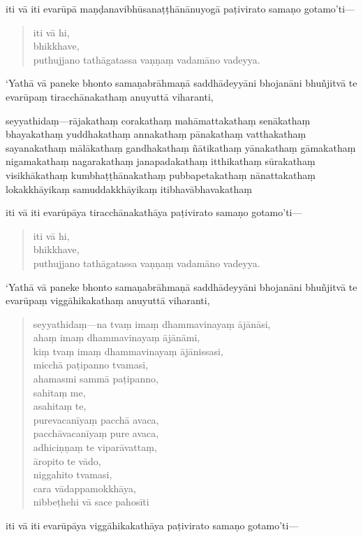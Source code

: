 \documentclass[11pt,twoside,openright]{book}
\begin{document}
\pstart
iti vā iti evarūpā maṇḍanavibhūsanaṭṭhānānuyogā paṭivirato samaṇo gotamo’ti—
\pend

\begin{verse}
iti vā hi,\\
\vin  bhikkhave,\\
\vin  puthujjano tathāgatassa vaṇṇaṃ vadamāno vadeyya.

\end{verse}
\pstart
‘Yathā vā paneke bhonto samaṇabrāhmaṇā saddhādeyyāni bhojanāni bhuñjitvā te evarūpaṃ tiracchānakathaṃ anuyuttā viharanti,
\pend

\pstart
seyyathidaṃ—rājakathaṃ corakathaṃ mahāmattakathaṃ senākathaṃ bhayakathaṃ yuddhakathaṃ annakathaṃ pānakathaṃ vatthakathaṃ sayanakathaṃ mālākathaṃ gandhakathaṃ ñātikathaṃ yānakathaṃ gāmakathaṃ nigamakathaṃ nagarakathaṃ janapadakathaṃ itthikathaṃ sūrakathaṃ visikhākathaṃ kumbhaṭṭhānakathaṃ pubbapetakathaṃ nānattakathaṃ lokakkhāyikaṃ samuddakkhāyikaṃ itibhavābhavakathaṃ
\pend

\pstart
iti vā iti evarūpāya tiracchānakathāya paṭivirato samaṇo gotamo’ti—
\pend

\begin{verse}
iti vā hi,\\
\vin  bhikkhave,\\
\vin  puthujjano tathāgatassa vaṇṇaṃ vadamāno vadeyya.

\end{verse}
\pstart
‘Yathā vā paneke bhonto samaṇabrāhmaṇā saddhādeyyāni bhojanāni bhuñjitvā te evarūpaṃ viggāhikakathaṃ anuyuttā viharanti,
\pend

\begin{verse}
seyyathidaṃ—na tvaṃ imaṃ dhammavinayaṃ ājānāsi,\\
\vin  ahaṃ imaṃ dhammavinayaṃ ājānāmi,\\
\vin  kiṃ tvaṃ imaṃ dhammavinayaṃ ājānissasi,\\
\vin  micchā paṭipanno tvamasi,\\
\vin  ahamasmi sammā paṭipanno,\\
\vin  sahitaṃ me,\\
\vin  asahitaṃ te,\\
\vin  purevacanīyaṃ pacchā avaca,\\
\vin  pacchāvacanīyaṃ pure avaca,\\
\vin  adhiciṇṇaṃ te viparāvattaṃ,\\
\vin  āropito te vādo,\\
\vin  niggahito tvamasi,\\
\vin  cara vādappamokkhāya,\\
\vin  nibbeṭhehi vā sace pahosīti

\end{verse}
\pstart
iti vā iti evarūpāya viggāhikakathāya paṭivirato samaṇo gotamo’ti—
\pend
\end{document}
